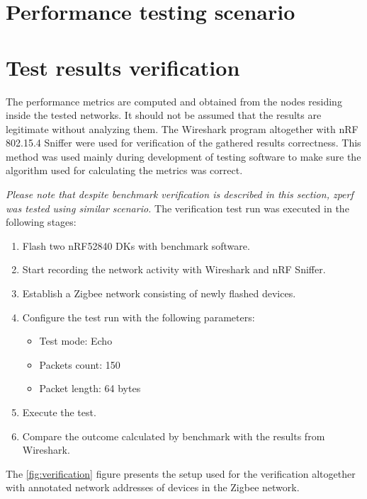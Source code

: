 \medskip
\section{Performance testing scenario}
\label{sec:performance-testing-scenario}


\medskip
\section{Test results verification}
\label{sec:test-results-verification}

The performance metrics are computed and obtained from the nodes residing inside 
the tested networks. It should not be assumed that the results are legitimate without
analyzing them. The Wireshark program altogether with nRF 802.15.4 Sniffer were used for verification of the gathered results correctness. This method was used mainly during development of testing
software to make sure the algorithm used for calculating the metrics was correct.

\textit{Please note that despite benchmark verification is described in this section, zperf was tested using similar scenario.} The verification test run was executed in the following stages:

\begin{enumerate}
    \itemsep0em
    \item Flash two nRF52840 DKs with benchmark software.
    \item Start recording the network activity with Wireshark and nRF Sniffer.
    \item Establish a Zigbee network consisting of newly flashed devices.
    \item Configure the test run with the following parameters:
    \begin{itemize}
        \itemsep0em
        \item Test mode: Echo
        \item Packets count: 150
        \item Packet length: 64 bytes 
    \end{itemize}
    \item Execute the test.
    \item Compare the outcome calculated by benchmark with the results 
    from Wireshark.
\end{enumerate}

The \ref{fig:verification} figure presents the setup used for the verification 
altogether with annotated network addresses of devices in the Zigbee network.

